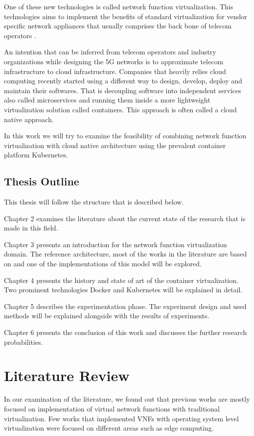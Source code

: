\documentclass[12pt,oneandhalf,chaparabic,ceng,ms,eng,oneside,pntc]{gsufbe}
\begin{document}
One of these new technologies is called network function virtualization.  This technologies aims to
implement the benefits of standard virtualization for vendor specific network appliances that usually
comprises the back bone of telecom operators \cite{abdelwahab_network_2016}.

An intention that can be inferred from telecom operators and industry organizations while designing the
5G networks is to approximate telecom infrastructure to cloud infrastructure.  Companies that heavily
relies cloud computing recently started using a different way to design, develop, deploy and maintain
their softwares.  That is decoupling software into independent services also called microservices and
running them inside a more lightweight virtualization solution called containers.  This approach is 
often called a cloud native approach.

In this work we will try to examine the feasibility of combining network function virtualization with
cloud native architecture using the prevalent container platform Kubernetes.

\section{Thesis Outline}
This thesis will follow the structure that is described below.

Chapter 2 examines the literature about the current state of the research that is made in this field. 

Chapter 3 presents an introduction for the network function virtualization domain.  The reference
architecture, most of the works in the literature are based on and one of the implementations of this
model will be explored.

Chapter 4 presents the history and state of art of the container virtualization.  Two prominent
technologies Docker and Kubernetes will be explained in detail.

Chapter 5 describes the experimentation phase.  The experiment design and used methods will be explained
alongside with the results of experiments.

Chapter 6 presents the conclusion of this work and discusses the further research probabilities.

\chapter{Literature Review}
In our examination of the literature, we found out that previous works are mostly focused on
implementation of virtual network functions with traditional virtualization.  Few works that implemented
VNFs with operating system level virtualization were focused on different areas such as edge 
computing.
\end{document}
